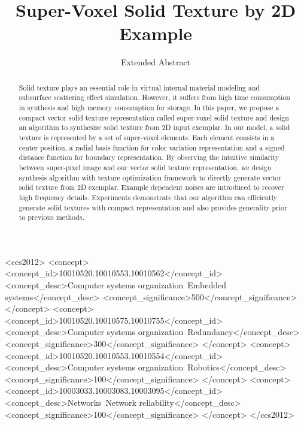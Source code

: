 \documentclass[sigconf]{acmart}
\begin{document}
\title{Super-Voxel Solid Texture by 2D Example}
\subtitle{Extended Abstract}

\renewcommand{\shortauthors}{B. Trovato et al.}

\begin{abstract}
Solid texture plays an essential role in virtual internal material modeling and subsurface scattering effect simulation. However, it suffers from high time consumption in synthesis and high memory consumption for storage. In this paper, we propose a compact vector solid texture representation called super-voxel solid texture and design an algorithm to synthesize solid texture from 2D input exemplar. In our model, a solid texture is represented by a set of super-voxel elements. Each element consists in a center position, a radial basis function for color variation representation and a signed distance function for boundary representation. By observing the intuitive similarity between super-pixel image and our vector solid texture representation, we design synthesis algorithm with texture optimization framework to directly generate vector solid texture from 2D exemplar. Example dependent noises are introduced to recover high frequency details. Experiments demonstrate that our algorithm can efficiently generate solid textures with compact representation and also provides generality prior to previous methods.
\end{abstract}

%
%
\begin{CCSXML}
	<ccs2012>
	<concept>
	<concept_id>10010520.10010553.10010562</concept_id>
	<concept_desc>Computer systems organization~Embedded systems</concept_desc>
	<concept_significance>500</concept_significance>
	</concept>
	<concept>
	<concept_id>10010520.10010575.10010755</concept_id>
	<concept_desc>Computer systems organization~Redundancy</concept_desc>
	<concept_significance>300</concept_significance>
	</concept>
	<concept>
	<concept_id>10010520.10010553.10010554</concept_id>
	<concept_desc>Computer systems organization~Robotics</concept_desc>
	<concept_significance>100</concept_significance>
	</concept>
	<concept>
	<concept_id>10003033.10003083.10003095</concept_id>
	<concept_desc>Networks~Network reliability</concept_desc>
	<concept_significance>100</concept_significance>
	</concept>
	</ccs2012>  
\end{CCSXML}
\end{document}
